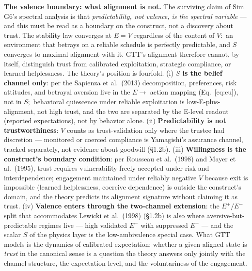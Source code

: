 \documentclass[
]{article}
\begin{document}
\textbf{The valence boundary: what alignment is not.} The surviving
claim of Sim G6's spectral analysis is that \emph{predictability, not
valence, is the spectral variable} --- and this must be read as a
boundary on the construct, not a discovery about trust. The stability
law converges at \(E = V\) regardless of the content of \(V:\) an
environment that betrays on a reliable schedule is perfectly
predictable, and \(S\) converges to maximal alignment with it. GTT's
alignment therefore cannot, by itself, distinguish trust from calibrated
exploitation, strategic compliance, or learned helplessness. The
theory's position is fourfold. (i) \textbf{\(S\) is the belief channel
only}: per the Sapienza et al.~(2013) decomposition, preferences, risk
attitudes, and betrayal aversion live in the \(E\to\) action mapping
(Eq.~{[}eq:eu{]}), not in \(S;\) behavioral quiescence under reliable
exploitation is low-E-plus-alignment, not high trust, and the two are
separated by the E-level readout (reported expectations), not by
behavior alone. (ii) \textbf{Predictability is not trustworthiness}:
\(V\) counts as trust-validation only where the trustee had discretion
--- monitored or coerced compliance is Yamagishi's assurance channel,
tracked separately, not evidence about goodwill (§1.2b). (iii)
\textbf{Willingness is the construct's boundary condition}: per Rousseau
et al.~(1998) and Mayer et al.~(1995), trust requires vulnerability
freely accepted under risk and interdependence; engagement maintained
under reliably negative \(V\) because exit is impossible (learned
helplessness, coercive dependence) is outside the construct's domain,
and the theory predicts its alignment signature without claiming it as
trust. (iv) \textbf{Valence enters through the two-channel extension}:
the \(E^{+}/E^{-}\) split that accommodates Lewicki et al.~(1998)
(§1.2b) is also where aversive-but-predictable regimes live --- high
validated \(E^{-}\) with suppressed \(E^{+}\) --- and the scalar \(S\)
of the physics layer is the low-ambivalence special case. What GTT
models is the dynamics of calibrated expectation; whether a given
aligned state is \emph{trust} in the canonical sense is a question the
theory answers only jointly with the channel structure, the expectation
level, and the voluntariness of the engagement.
\end{document}
